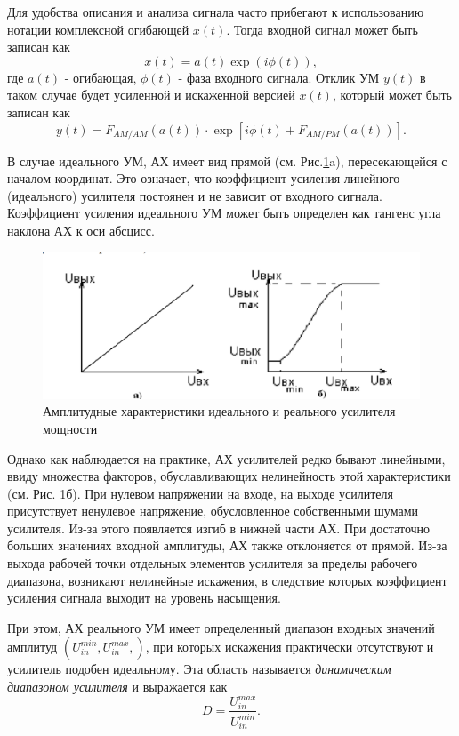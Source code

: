Для удобства описания и анализа сигнала часто прибегают к использованию
нотации комплексной огибающей $x(t)$. Тогда входной сигнал может быть
записан как 
\begin{equation}
    x(t) = a(t) \exp(i\phi(t)),
\end{equation}
где $a(t)$ - огибающая, $\phi(t)$ - фаза входного сигнала. Отклик УМ $y(t)$
в таком случае будет усиленной и искаженной версией $x(t)$, который может
быть записан как
\begin{equation}
    y(t) = F_{AM/AM}(a(t)) \cdot \exp[i \phi(t) + F_{AM/PM}(a(t))].
\end{equation}

В случае идеального УМ, АХ имеет вид прямой (см. Рис.\ref{fig:1.1}a),
пересекающейся с началом координат. Это означает, что коэффициент усиления
линейного (идеального) усилителя постоянен и не зависит от входного
сигнала. Коэффициент усиления идеального УМ может быть определен как
тангенс угла наклона АХ к оси абсцисс.

\begin{figure}[h!]
    \centering
    \includegraphics[width=0.8\linewidth]{figs/def_pa_char.png}
    \caption{Амплитудные характеристики идеального и реального усилителя мощности}
    \label{fig:1.1}
\end{figure}

Однако как наблюдается на практике, АХ усилителей редко бывают линейными,
ввиду множества факторов, обуславливающих нелинейность этой характеристики
(см. Рис. \ref{fig:1.1}б). При нулевом напряжении на входе, на выходе
усилителя присутствует ненулевое напряжение, обусловленное собственными
шумами усилителя. Из-за этого появляется изгиб в нижней части АХ. При
достаточно больших значениях входной амплитуды, АХ также отклоняется от
прямой. Из-за выхода рабочей точки отдельных элементов усилителя за пределы
рабочего диапазона, возникают нелинейные искажения, в следствие которых
коэффициент усиления сигнала выходит на уровень насыщения.

При этом, АХ реального УМ имеет определенный диапазон входных значений
амплитуд $(U_{in}^{min},U_{in}^{max},)$, при которых искажения практически
отсутствуют и усилитель подобен идеальному. Эта область называется
\textit{динамическим диапазоном усилителя} и выражается как
\begin{equation}
    D = \frac{U_{in}^{max}}{U_{in}^{min}}.
\end{equation}

